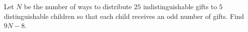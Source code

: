 Let $N$ be the number of ways to distribute $25$ indistinguishable gifts to $5$ distinguishable children so that each child receives an odd number of gifts. Find $9N-8$.
